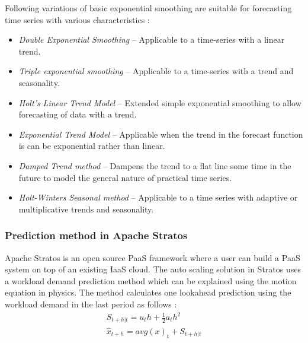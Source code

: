 Following variations of basic exponential smoothing are suitable for forecasting time series with various characteristics \cite{Forecasting_OTexts}:

\begin{itemize}
\item \textit{Double Exponential Smoothing} -- Applicable to a time-series with a linear trend.
\item \textit{Triple exponential smoothing} -- Applicable to a time-series with a trend and seasonality.
\item \textit{Holt's Linear Trend Model} -- Extended simple exponential smoothing to allow forecasting of data with a trend.
\item \textit{Exponential Trend Model} -- Applicable when the trend in the forecast function is can be exponential rather than linear.
\item \textit{Damped Trend method} -- Dampens the trend to a flat line some time in the future to model the general nature of practical time series.
\item \textit{Holt-Winters Seasonal method} -- Applicable to a time series with adaptive or multiplicative trends and seasonality.
\end{itemize}

\subsubsection{Prediction method in Apache Stratos}
Apache Stratos is an open source PaaS framework where a user can build a PaaS system on top of an existing IaaS cloud. The auto scaling solution in Stratos uses a workload demand prediction method which can be explained using the motion equation in physics. The method calculates one lookahead prediction using the workload demand in the last period as follows \cite{StratosModel}:
\begin{eqnarray}
S_{t+h|t} = u_{t}h+ \frac{1}{2} a_{t}h^2 \\
\hat{x}_{t+h}=avg(x)_{t} + S_{t+h|t} 
\end{eqnarray}

